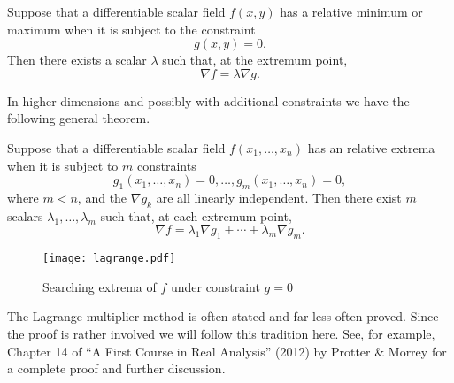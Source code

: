 \begin{theorem}
    Suppose that a differentiable scalar field \(f(x,y)\) has a relative minimum or maximum when it is subject to the constraint
    \[
        g(x,y) = 0.
    \]
    Then there exists a scalar \(\lambda\) such that, at the extremum point,
    \[
        \nabla f = \lambda \nabla g.
    \]
\end{theorem}

In higher dimensions and possibly with additional constraints we have the following general theorem.

\begin{theorem*}
    Suppose that a differentiable scalar field \(f(x_1,\ldots,x_n)\) has an relative extrema when it is subject to \(m\) constraints
    \[
        g_1(x_1,\ldots,x_n) = 0,
        \dots , g_m(x_1,\ldots,x_n)=0,
    \]
    where \(m<n\), and the \(\nabla g_k\) are all linearly independent.
    Then there exist \(m\) scalars \(\lambda_1,\ldots,\lambda_m\) such that, at each extremum point,
    \[
        \nabla f = \lambda_1 \nabla g_1 + \cdots + \lambda_m \nabla g_m.
    \]
\end{theorem*}

\begin{figure}[htb]
    \begin{center}
        \texttt{[image: lagrange.pdf]}
        \caption{Searching extrema of \(f\) under constraint \(g=0\)}
        \label{fig:lagrange}
    \end{center}
\end{figure}

The Lagrange multiplier method is often stated and far less often proved. 
Since the proof is rather involved we will follow this tradition here.
See, for example, Chapter 14 of  ``A First Course in Real Analysis''  (2012) by Protter \& Morrey for a complete proof and further discussion.


